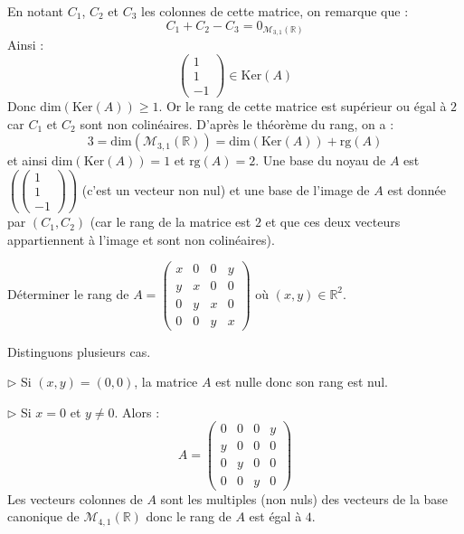 \documentclass[a4paper,10pt]{report}
\begin{document}
\corr En notant $C_1$, $C_2$ et $C_3$ les colonnes de cette matrice, on remarque que :
$$C_1+C_2-C_3 = 0_{\mathcal{M}_{3,1}(\mathbb{R})}$$
Ainsi :
$$ \begin{pmatrix}
1 \\
1 \\
-1 
\end{pmatrix} \in \textrm{Ker}(A) $$
Donc $\textrm{dim}(\textrm{Ker}(A)) \geq 1$. Or le rang de cette matrice est supérieur ou égal à $2$ car $C_1$ et $C_2$ sont non colinéaires. D'après le théorème du rang, on a :
$$ 3=\textrm{dim}(\mathcal{M}_{3,1}(\mathbb{R})) = \textrm{dim}(\textrm{Ker}(A)) + \textrm{rg}(A)$$
et ainsi $\textrm{dim}(\textrm{Ker}(A)) = 1$ et $\textrm{rg}(A)=2$. Une base du noyau de $A$ est $\left(  \begin{pmatrix}
1 \\
1 \\
-1 
\end{pmatrix} \right)$ (c'est un vecteur non nul) et une base de l'image de $A$ est donnée par $(C_1,C_2)$ (car le rang de la matrice est $2$ et que ces deux vecteurs appartiennent à l'image et sont non colinéaires).

\begin{Exa} Déterminer le rang de $A = \begin{pmatrix}
x & 0 & 0& y \\
y & x & 0 & 0 \\
0 & y & x & 0 \\
0 & 0 & y & x
\end{pmatrix}$ où $(x,y) \in \mathbb{R}^2$.
\end{Exa} 

\corr Distinguons plusieurs cas.

\medskip

\noindent $\rhd$ Si $(x,y)=(0,0)$, la matrice $A$ est nulle donc son rang est nul.

\medskip

\noindent $\rhd$ Si $x=0$ et $y \neq 0$. Alors :
$$ A = \begin{pmatrix}
0 & 0 & 0& y \\
y & 0 & 0 & 0 \\
0 & y & 0 & 0 \\
0 & 0 & y & 0
\end{pmatrix}$$
Les vecteurs colonnes de $A$ sont les multiples (non nuls) des vecteurs de la base canonique de $\mathcal{M}_{4,1}(\mathbb{R})$ donc le rang de $A$ est égal à $4$.

\medskip
\end{document}
